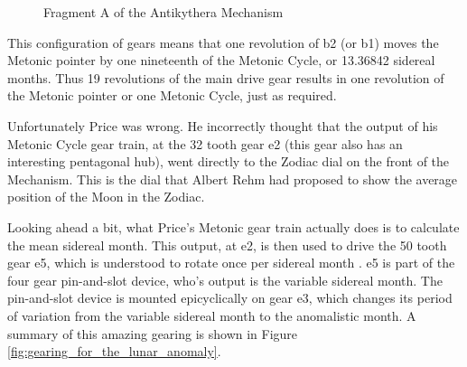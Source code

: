 \documentclass{article}
\theoremstyle{definition}
\begin{document}
\begin{figure}[H]
\caption{Fragment A of the Antikythera Mechanism \cite{wiki:fragmentA}}
\label{fig:fragmentA}
\end{figure}

\bigskip
\noindent
This configuration of gears means that one revolution of b2 (or
b1) moves the Metonic pointer by one nineteenth of the Metonic
Cycle, or 13.36842 sidereal months. Thus 19 revolutions of the
main drive gear results in one revolution of the Metonic pointer
or one Metonic Cycle, just as required.

\bigskip
\noindent
Unfortunately Price was wrong. He incorrectly thought that the
output of his Metonic Cycle gear train, at the 32 tooth gear e2
(this gear also has an interesting pentagonal hub), went directly
to the Zodiac dial on the front of the Mechanism. This is the
dial that Albert Rehm \cite{wiki:rehm} had proposed to show the
average position of the Moon in the Zodiac.

\bigskip
\noindent
Looking ahead a bit, what Price's Metonic gear train actually
does is to calculate the mean sidereal month.  This output, at
e2, is then used to drive the 50 tooth gear e5, which is
understood to rotate once per sidereal month
\cite{Freeth2006a}. e5 is part of the four gear pin-and-slot
device, who's output is the variable sidereal month. The
pin-and-slot device is mounted epicyclically on gear e3, which
changes its period of variation from the variable sidereal month
to the anomalistic month. A summary of this amazing gearing is
shown in Figure \ref{fig:gearing_for_the_lunar_anomaly}.
\end{document}
